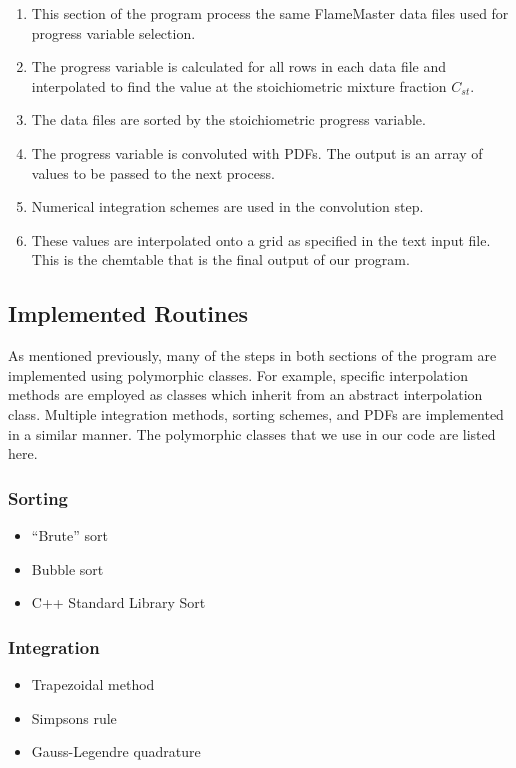 \documentclass[11pt]{article}
\begin{document}
\begin{enumerate}
\item This section of the program process the same FlameMaster data
  files used for progress variable selection. 
\item The progress variable is calculated for all rows in each data
  file and interpolated to find the value at the stoichiometric
  mixture fraction $C_{st}$.
\item The data files are sorted by the stoichiometric progress
  variable.
\item The progress variable is convoluted with PDFs.  The output is an
  array of values to be passed to the next process.
\item Numerical integration schemes are used in the convolution step.
\item These values are interpolated onto a grid as specified in the
  text input file.  This is the chemtable that is the final
  output of our program.
\end{enumerate}

\subsection{Implemented Routines}
As mentioned previously, many of the steps in both sections of the
program are implemented using polymorphic classes. For example,
specific interpolation methods are employed as classes which inherit
from an abstract interpolation class. Multiple integration methods,
sorting schemes, and PDFs are implemented in a similar manner. The
polymorphic classes that we use in our code are listed here.

\subsubsection{Sorting}
\begin{itemize}
\item “Brute” sort 
\item Bubble sort
\item C++ Standard Library Sort
\end{itemize}

\subsubsection{Integration}
\begin{itemize}
\item Trapezoidal method
\item Simpson\textquotesingle s rule
\item Gauss-Legendre quadrature
\end{itemize}
\end{document}
